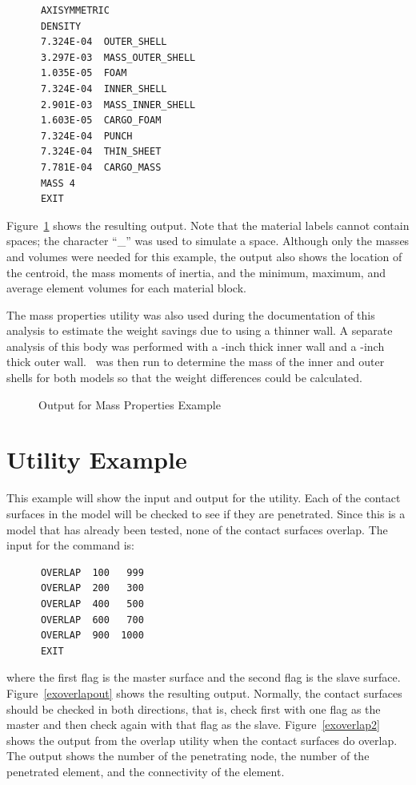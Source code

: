 \begin{verbatim}
      AXISYMMETRIC
      DENSITY
      7.324E-04  OUTER_SHELL
      3.297E-03  MASS_OUTER_SHELL
      1.035E-05  FOAM
      7.324E-04  INNER_SHELL
      2.901E-03  MASS_INNER_SHELL
      1.603E-05  CARGO_FOAM
      7.324E-04  PUNCH
      7.324E-04  THIN_SHEET
      7.781E-04  CARGO_MASS
      MASS 4
      EXIT
\end{verbatim}

Figure~\ref{exmassout} shows the resulting output.  Note that the
material labels cannot contain spaces; the character ``\_'' was used to
simulate a space. Although only the masses and volumes were needed for
this example, the output also shows the location of the centroid, the
mass moments of inertia, and the minimum, maximum, and average element
volumes for each material block.

The mass properties utility was also used during the documentation of
this analysis to estimate the weight savings due to using a thinner
wall.  A separate analysis of this body was performed with a
-inch thick inner wall and a -inch thick outer wall.
\numbers\ was then run to determine the mass of the inner and outer
shells for both models so that the weight differences could be
calculated.

\begin{figure}

\caption{Output for Mass Properties Example}\label{exmassout}
\end{figure}

\section{ Utility Example}
This example will show the input and output for the 
utility.  Each of the contact surfaces in the model will be checked to
see if they are penetrated.  Since this is a model that has already been
tested, none of the contact surfaces overlap.
The input for the command is:

\begin{verbatim}
      OVERLAP  100   999
      OVERLAP  200   300
      OVERLAP  400   500
      OVERLAP  600   700
      OVERLAP  900  1000
      EXIT
\end{verbatim}

where the first flag is the master surface and the second flag is the
slave surface. Figure~\ref{exoverlapout} shows the resulting output.
Normally, the contact surfaces should be checked in both directions,
that is, check first with one flag as the master and then check again
with that flag as the slave.  Figure~\ref{exoverlap2} shows the output
from the overlap utility when the contact surfaces do overlap.  The
output shows the number of the penetrating node, the number of the
penetrated element, and the connectivity of the element.

